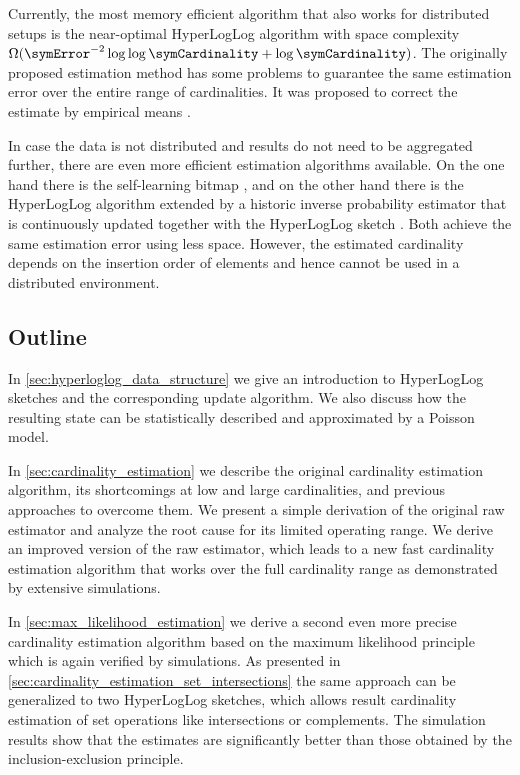 \documentclass[a4paper]{scrartcl}
\begin{document}
Currently, the most memory efficient algorithm that also works for distributed setups is the near-optimal HyperLogLog algorithm \cite{Flajolet2007} with space complexity $\Omega(\symError^{-2} \log\log\symCardinality +\log \symCardinality)$. The originally proposed estimation method has some problems to guarantee the same estimation error over the entire range of cardinalities. It was proposed to correct the estimate by empirical means \cite{Heule2013,Rhodes2015,Sanfilippo2014}. 

In case the data is not distributed and results do not need to be aggregated further, there are even more efficient estimation algorithms available. On the one hand there is the self-learning bitmap \cite{Chen2011}, and on the other hand there is the HyperLogLog algorithm extended by a historic inverse probability estimator that is continuously updated together with the HyperLogLog sketch \cite{Ting2014, Cohen2014}. Both achieve the same estimation error using less space. However, the estimated cardinality depends on the insertion order of elements and hence cannot be used in a distributed environment. 

\subsection{Outline}
In \cref{sec:hyperloglog_data_structure} we give an introduction to HyperLogLog sketches and the corresponding update algorithm. We also discuss how the resulting state can be statistically described and approximated by a Poisson model.

In \cref{sec:cardinality_estimation} we describe the original cardinality estimation algorithm, its shortcomings at low and large cardinalities, and previous approaches to overcome them. We present a simple derivation of the original raw estimator and analyze the root cause for its limited operating range. We derive an improved version of the raw estimator, which leads to a new fast cardinality estimation algorithm that works over the full cardinality range as demonstrated by extensive simulations.

In \cref{sec:max_likelihood_estimation} we derive a second even more precise cardinality estimation algorithm based on the maximum likelihood principle which is again verified by simulations. As presented in \cref{sec:cardinality_estimation_set_intersections} the same approach can be generalized to two HyperLogLog sketches, which allows result cardinality estimation of set operations like intersections or complements. The simulation results show that the estimates are significantly better than those obtained by the inclusion-exclusion principle.
\end{document}

